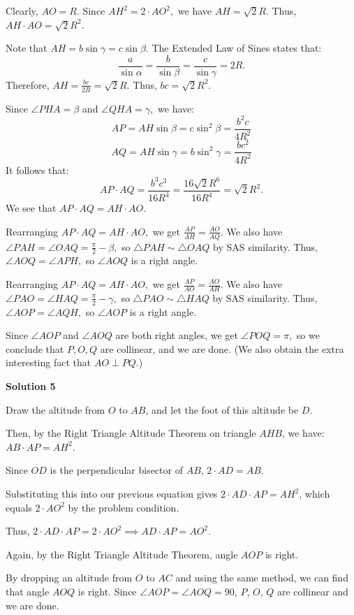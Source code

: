 \begin{enumerate}
 Clearly, $AO = R.$ Since $AH^2 = 2\cdot AO^2,$ we have $AH = \sqrt{2}R.$ Thus, $AH\cdot AO = \sqrt{2}R^2.$

 Note that $AH = b\sin\gamma = c\sin\beta.$ The Extended Law of Sines states that:
 \[\frac{a}{\sin\alpha} = \frac{b}{\sin\beta} = \frac{c}{\sin\gamma} = 2R.\]Therefore, $AH = \frac{bc}{2R} = \sqrt{2}R.$ Thus, $bc = \sqrt{2}R^2.$

 Since $\angle PHA = \beta$ and $\angle QHA = \gamma,$ we have:
 \[AP = AH\sin\beta = c\sin^2\beta = \frac{b^2 c}{4R^2}\]
 \[AQ = AH\sin\gamma = b\sin^2\gamma = \frac{bc^2}{4R^2}\]It follows that:
 \[AP\cdot AQ = \frac{b^3 c^3}{16R^4} = \frac{16\sqrt{2}R^6}{16R^4} = \sqrt{2}R^2.\]We see that $AP\cdot AQ = AH\cdot AO.$

 Rearranging $AP\cdot AQ = AH\cdot AO,$ we get $\frac{AP}{AH} = \frac{AO}{AQ}.$ We also have $\angle PAH = \angle OAQ = \frac{\pi}{2} - \beta,$ so $\triangle PAH\sim\triangle OAQ$ by SAS similarity. Thus, $\angle AOQ = \angle APH,$ so $\angle AOQ$ is a right angle.

 Rearranging $AP\cdot AQ = AH\cdot AO,$ we get $\frac{AP}{AO} = \frac{AO}{AH}.$ We also have $\angle PAO = \angle HAQ = \frac{\pi}{2} - \gamma,$ so $\triangle PAO\sim\triangle HAQ$ by SAS similarity. Thus, $\angle AOP = \angle AQH,$ so $\angle AOP$ is a right angle.

 Since $\angle AOP$ and $\angle AOQ$ are both right angles, we get $\angle POQ = \pi,$ so we conclude that $P, O, Q$ are collinear, and we are done. (We also obtain the extra interesting fact that $AO\perp PQ.$)

 



\textbf{Solution 5}

Draw the altitude from $O$ to $AB$, and let the foot of this altitude be $D$. 

 Then, by the Right Triangle Altitude Theorem on triangle $AHB$, we have: $AB\cdot AP=AH^{2}$.

 Since $OD$ is the perpendicular bisector of $AB$, $2\cdot AD = AB$.

 Substituting this into our previous equation gives $2\cdot AD \cdot AP = AH^{2}$, which equals $2\cdot AO^{2}$ by the problem condition.

 Thus, $2\cdot AD\cdot AP = 2\cdot AO^{2} \implies AD\cdot AP = AO^{2}$.

 Again, by the Right Triangle Altitude Theorem, angle $AOP$ is right.

 By dropping an altitude from $O$ to $AC$ and using the same method, we can find that angle $AOQ$ is right. Since $\angle AOP=\angle AOQ=90$, $P$, $O$, $Q$ are collinear and we are done.


\end{enumerate}
